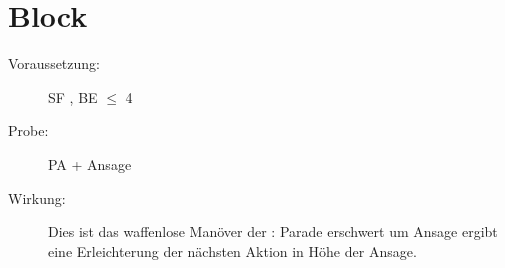 \section{Block}
\label{uPA.block}
\begin{description}
    \item[Voraussetzung:]
        SF , BE\textrm{ ${\leq}$ }4
    \item[Probe:]
        PA + Ansage
    \item[Wirkung:] Dies ist das waffenlose Manöver der :
    Parade erschwert um Ansage ergibt eine Erleichterung der nächsten Aktion in Höhe der Ansage.
\end{description}
